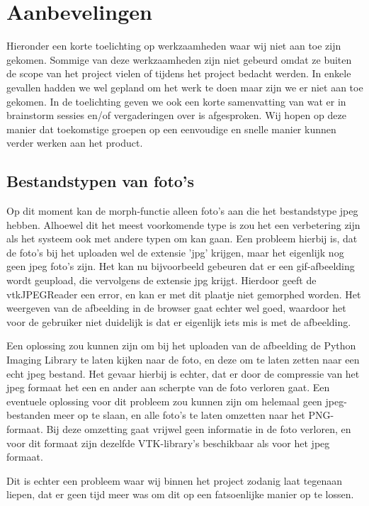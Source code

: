 \section{Aanbevelingen}
\label{Aanbevelingen}
Hieronder een korte toelichting op werkzaamheden waar wij niet aan toe zijn gekomen. 
Sommige van deze werkzaamheden zijn niet gebeurd omdat ze buiten de scope van het project vielen of tijdens het project bedacht werden. 
In enkele gevallen hadden we wel gepland om het werk te doen maar zijn we er niet aan toe gekomen.  
In de toelichting geven we ook een korte samenvatting van wat er in brainstorm sessies en/of vergaderingen over is afgesproken. 
Wij hopen op deze manier dat toekomstige groepen op een eenvoudige en snelle manier kunnen verder werken aan het product.

\subsection{Bestandstypen van foto's}
Op dit moment kan de morph-functie alleen foto's aan die het bestandstype jpeg hebben. 
Alhoewel dit het meest voorkomende type is zou het een verbetering zijn als het systeem ook met andere typen om kan gaan. 
Een probleem hierbij is, dat de foto's bij het uploaden wel de extensie 'jpg' krijgen, maar het eigenlijk nog geen jpeg foto's zijn. 
Het kan nu bijvoorbeeld gebeuren dat er een gif-afbeelding wordt geupload, die vervolgens de extensie jpg krijgt. 
Hierdoor geeft de vtkJPEGReader een error, en kan er met dit plaatje niet gemorphed worden. 
Het weergeven van de afbeelding in de browser gaat echter wel goed, waardoor het voor de gebruiker niet duidelijk is dat er eigenlijk iets mis is met de afbeelding.

Een oplossing zou kunnen zijn om bij het uploaden van de afbeelding de Python Imaging Library te laten kijken naar de foto, en deze om te laten zetten naar een echt jpeg bestand. 
Het gevaar hierbij is echter, dat er door de compressie van het jpeg formaat het een en ander aan scherpte van de foto verloren gaat.
Een eventuele oplossing voor dit probleem zou kunnen zijn om helemaal geen jpeg-bestanden meer op te slaan, en alle foto's te laten omzetten naar het PNG-formaat. Bij deze omzetting gaat vrijwel geen informatie in de foto verloren, en voor dit formaat zijn dezelfde VTK-library's beschikbaar als voor het jpeg formaat.

Dit is echter een probleem waar wij binnen het project zodanig laat tegenaan liepen, dat er geen tijd meer was om dit op een fatsoenlijke manier op te lossen.

